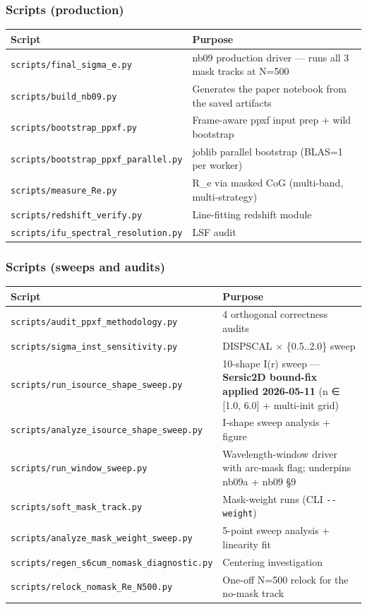 \documentclass[
  10pt,
]{article}
\begin{document}
\hypertarget{scripts-production}{%
\subsubsection{Scripts (production)}\label{scripts-production}}

\begingroup\small\setlength{\tabcolsep}{4pt}\begin{longtable}[]{@{}ll@{}}
\toprule
Script & Purpose \\
\midrule
\endhead
\texttt{scripts/final\_sigma\_e.py} & nb09 production driver --- runs all 3 mask tracks at N=500 \\
\texttt{scripts/build\_nb09.py} & Generates the paper notebook from the saved artifacts \\
\texttt{scripts/bootstrap\_ppxf.py} & Frame-aware ppxf input prep + wild bootstrap \\
\texttt{scripts/bootstrap\_ppxf\_parallel.py} & joblib parallel bootstrap (BLAS=1 per worker) \\
\texttt{scripts/measure\_Re.py} & R\_e via masked CoG (multi-band, multi-strategy) \\
\texttt{scripts/redshift\_verify.py} & Line-fitting redshift module \\
\texttt{scripts/ifu\_spectral\_resolution.py} & LSF audit \\
\bottomrule
\end{longtable}\endgroup

\hypertarget{scripts-sweeps-and-audits}{%
\subsubsection{Scripts (sweeps and audits)}\label{scripts-sweeps-and-audits}}

\begingroup\small\setlength{\tabcolsep}{4pt}\begin{longtable}[]{@{}ll@{}}
\toprule
Script & Purpose \\
\midrule
\endhead
\texttt{scripts/audit\_ppxf\_methodology.py} & 4 orthogonal correctness audits \\
\texttt{scripts/sigma\_inst\_sensitivity.py} & DISPSCAL × \{0.5..2.0\} sweep \\
\texttt{scripts/run\_isource\_shape\_sweep.py} & 10-shape I(r) sweep --- \textbf{Sersic2D bound-fix applied 2026-05-11} (n ∈ {[}1.0, 6.0{]} + multi-init grid) \\
\texttt{scripts/analyze\_isource\_shape\_sweep.py} & I-shape sweep analysis + figure \\
\texttt{scripts/run\_window\_sweep.py} & Wavelength-window driver with arc-mask flag; underpins nb09a + nb09 §9 \\
\texttt{scripts/soft\_mask\_track.py} & Mask-weight runs (CLI \texttt{-\/-weight}) \\
\texttt{scripts/analyze\_mask\_weight\_sweep.py} & 5-point sweep analysis + linearity fit \\
\texttt{scripts/regen\_s6cum\_nomask\_diagnostic.py} & Centering investigation \\
\texttt{scripts/relock\_nomask\_Re\_N500.py} & One-off N=500 relock for the no-mask track \\
\bottomrule
\end{longtable}\endgroup
\end{document}
